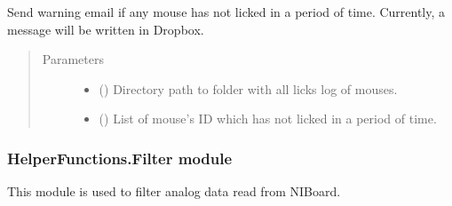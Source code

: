\documentclass[letterpaper,10pt,english]{sphinxmanual}
\begin{document}
\begin{fulllineitems}
\label{\detokenize{NoSeMazeController/HelperFunctions:HelperFunctions.Email.warning_licks}}
\pysigstartsignatures
{}
\pysigstopsignatures
\sphinxAtStartPar
Send warning e\sphinxhyphen{}mail if any mouse has not licked in a period of time.
Currently, a message will be written in Dropbox.
\begin{quote}\begin{description}
\item[{Parameters}] \leavevmode\begin{itemize}
\item {} 
\sphinxAtStartPar
{} () \textendash{} Directory path to folder with all licks log of mouses.

\item {} 
\sphinxAtStartPar
{} () \textendash{} List of mouse’s ID which has not licked in a period of time.

\end{itemize}

\end{description}\end{quote}

\end{fulllineitems}


\begin{DUlineblock}{0em}
\item[] 
\end{DUlineblock}


\subsubsection{HelperFunctions.Filter module}
\label{\detokenize{NoSeMazeController/HelperFunctions:module-HelperFunctions.Filter}}\label{\detokenize{NoSeMazeController/HelperFunctions:helperfunctions-filter-module}}
\sphinxAtStartPar
This module is used to filter analog data read from NI\sphinxhyphen{}Board.
\end{document}
